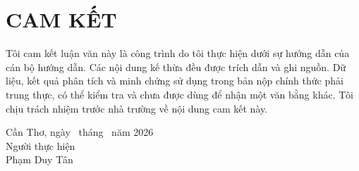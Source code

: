 \chapter*{CAM KẾT}
Tôi cam kết luận văn này là công trình do tôi thực hiện dưới sự hướng dẫn của cán bộ hướng dẫn. Các nội dung kế thừa đều được trích dẫn và ghi nguồn. Dữ liệu, kết quả phân tích và minh chứng sử dụng trong bản nộp chính thức phải trung thực, có thể kiểm tra và chưa được dùng để nhận một văn bằng khác. Tôi chịu trách nhiệm trước nhà trường về nội dung cam kết này.

\vspace{2cm}\begin{flushright}Cần Thơ, ngày \dotfill\ tháng \dotfill\ năm 2026\\Người thực hiện\\[2cm]Phạm Duy Tân\end{flushright}
